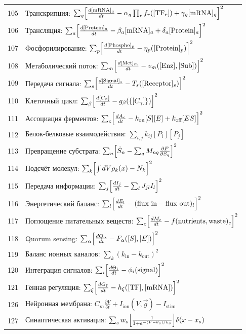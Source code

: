 \documentclass[12pt,a4paper]{article}
\begin{document}
\begin{longtable}{r l}
		105 & Транскрипция: $\sum_g\Bigl[\frac{d[\text{mRNA}]_g}{dt} - \alpha_g\prod_r f_r([\text{TF}_r]) + \gamma_g[\text{mRNA}]_g\Bigr]^2$ \\
		106 & Трансляция: $\sum_a\Bigl[\frac{d[\text{Protein}]_a}{dt} - \beta_a[\text{mRNA}]_a + \delta_a[\text{Protein}]_a\Bigr]^2$ \\
		107 & Фосфорилирование: $\sum_p\Bigl[\frac{d[\text{Phospho}]_p}{dt} - \eta_p([\text{Protein}]_p)\Bigr]^2$ \\
		108 & Метаболический поток: $\sum_m\Bigl[\frac{d[\text{Met}]_m}{dt} - v_m([\text{Enz}],[\text{Sub}])\Bigr]^2$ \\
		109 & Передача сигнала: $\sum_s\Bigl[\frac{d[\text{Signal}]_s}{dt} - T_s([\text{Receptor}]_s)\Bigr]^2$ \\
		110 & Клеточный цикл: $\sum_\beta\Bigl[\frac{d[C_\beta]}{dt} - g_\beta(\{[C_\gamma]\})\Bigr]^2$ \\
		111 & Ассоциация ферментов: $\sum_c\Bigl[\frac{dA_c}{dt} - k_{\text{on}}[S][E] + k_{\text{off}}[ES]\Bigr]^2$ \\
		112 & Белок-белковые взаимодействия: $\sum_{i,j}k_{ij}[P_i][P_j]$ \\
		113 & Превращение субстрата: $\sum_n\Bigl[\dot S_n - \sum_q M_{nq}\frac{\partial F}{\partial S_q}\Bigr]^2$ \\
		114 & Подсчёт молекул: $\sum_k\Bigl[\int dV\rho_k(x) - N_k\Bigr]^2$ \\
		115 & Передача информации: $\sum_j\Bigl[\frac{dI_j}{dt} - \sum_l J_{jl}I_l\Bigr]^2$ \\
		116 & Энергетический баланс: $\sum_l\Bigl[\frac{dE_l}{dt} - (\text{flux in} - \text{flux out})_l\Bigr]^2$ \\
		117 & Поглощение питательных веществ: $\sum_c\Bigl[\frac{dM_c}{dt} - f(\text{nutrients},\text{waste})_c\Bigr]^2$ \\
		118 & Quorum sensing: $\sum_\alpha\Bigl[\frac{dQ_\alpha}{dt} - F_\alpha([S],[E])\Bigr]^2$ \\
		119 & Баланс ионных каналов: $\sum_k(k_{\text{in}} - k_{\text{out}})^2$ \\
		120 & Интеграция сигналов: $\sum_i\Bigl[\frac{d\Theta_i}{dt} - \phi_i(\text{signal})\Bigr]^2$ \\
		121 & Генная регуляция: $\sum_\xi\Bigl[\frac{dG_\xi}{dt} - h_\xi([\text{TF}],[\text{mRNA}])\Bigr]^2$ \\
		126 & Нейронная мембрана: $C_m\frac{\partial V}{\partial t} + I_{\text{ion}}(V,\vec g) - I_{\text{stim}}$ \\
		127 & Синаптическая активация: $\sum_s w_s\Bigl[\frac{1}{1+e^{-(V-\theta_s)/k_s}}\Bigr]\delta(x-x_s)$ \\

\end{longtable}
\end{document}
